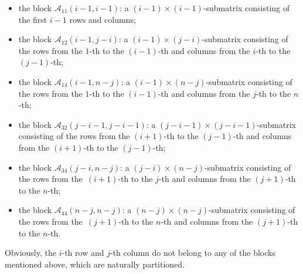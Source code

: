 \documentclass[pdftex]{sigma}
\numberwithin{equation}{section}
\def\A{\mathscr{A}}
\begin{document}
\begin{itemize}\itemsep=0pt
 \item the block $\A_{11}(i-1,i-1)$: a $(i-1)\times (i-1)$-submatrix consisting of the first $i-1$ rows and columns;
 \item the block $\A_{12}(i-1,j-i)$: a $(i-1)\times (j-i)$-submatrix consisting of the rows from the $1$-th to the $(i-1)$-th and columns from the $i$-th to the $(j-1)$-th;
 \item the block $\A_{14}(i-1,n-j)$: a $(i-1)\times (n-j)$-submatrix consisting of the rows from the $1$-th to the $(i-1)$-th and columns from the $j$-th to the $n$-th;
 \item the block $\A_{32}(j-i-1,j-i-1)$: a $(j-i-1)\times (j-i-1)$-submatrix consisting of the rows from the $(i+1)$-th to the $(j-1)$-th and columns from the $(i+1)$-th to the $(j-1)$-th;
 \item the block $\A_{34}(j-i,n-j)$: a $(j-i)\times (n-j)$-submatrix consisting of the rows from the~$(i+1)$-th to the $j$-th and columns from the $(j+1)$-th to the $n$-th;
 \item the block $ \A_{44}(n-j,n-j)$: a $(n-j)\times (n-j)$-submatrix consisting of the rows from the~$(j+1)$-th to the $n$-th and columns from the $(j+1)$-th to the $n$-th.
\end{itemize}
Obviously, the $i$-th row and $j$-th column do not belong to any of the blocks mentioned above, which are naturally partitioned.
\end{document}
